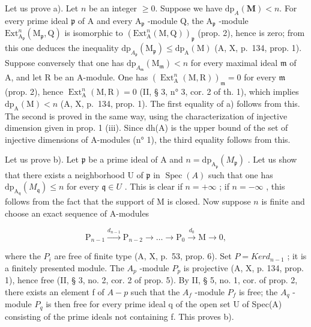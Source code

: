 Let us prove a). Let \(n\) be an integer \(\geqslant 0\). Suppose we have \(\mathrm{dp}_{A}(\mathbf{M}) < n\). For every prime ideal \(\mathfrak{p}\) of A and every \(\mathrm{A}_{\mathfrak{p}}\) -module Q, the \(\mathrm{A}_{\mathfrak{p}}\) -module \(\mathrm{Ext}_{\mathrm{A}_{\mathfrak{p}}}^{n}(\mathrm{M}_{\mathfrak{p}},\mathrm{Q})\) is isomorphic to \((\mathrm{Ext}_{\mathrm{A}}^{n}(\mathrm{M},\mathrm{Q}))_{\mathfrak{p}}\) (prop. 2), hence is zero; from this one deduces the inequality \(\mathrm{dp}_{A_{\mathfrak{p}}}(\mathrm{M}_{\mathfrak{p}}) \leqslant \mathrm{dp}_{\mathrm{A}}(\mathrm{M})\) (A, X, p.~134, prop. 1). Suppose conversely that one has \(\mathrm{dp}_{A_{\mathfrak{m}}}(\mathrm{M}_{\mathfrak{m}}) < n\) for every maximal ideal \(\mathfrak{m}\) of A, and let R be an A-module. One has \((\operatorname{Ext}_{\mathrm{A}}^{n}(\mathrm{M}, \mathrm{R}))_{\mathfrak{m}} = 0\) for every \(\mathfrak{m}\) (prop. 2), hence \(\operatorname{Ext}_{\mathrm{A}}^{n}(\mathrm{M}, \mathrm{R}) = 0\) (II, § 3, n° 3, cor. 2 of th. 1), which implies \(\mathrm{dp}_{\mathrm{A}}(\mathrm{M}) < n\) (A, X, p.~134, prop. 1). The first equality of a) follows from this. The second is proved in the same way, using the characterization of injective dimension given in prop. 1 (iii). Since dh(A) is the upper bound of the set of injective dimensions of A-modules (n° 1), the third equality follows from this.

Let us prove b). Let \(\mathfrak{p}\) be a prime ideal of A and \(n = \mathrm{dp}_{\mathrm{A}_{\mathfrak{p}}}(M_{\mathfrak{p}})\) . Let us show that there exists a neighborhood U of \(\mathfrak{p}\) in \(\operatorname{Spec}(A)\) such that one has \(\mathrm{dp}_{\mathrm{A}_{\mathfrak{q}}}(M_{\mathfrak{q}}) \leqslant n\) for every \(\mathfrak{q} \in U\) . This is clear if \(n = +\infty\) ; if \(n = -\infty\) , this follows from the fact that the support of M is closed. Now suppose \(n\) is finite and choose an exact sequence of A-modules

\[
\mathrm{P} _ {n - 1} \stackrel {d _ {n - 1}} {\longrightarrow} \mathrm{P} _ {n - 2} \longrightarrow \dots \longrightarrow \mathrm{P} _ {0} \stackrel {d _ {0}} {\longrightarrow} \mathrm{M} \rightarrow 0,
\]

where the \(P_{i}\) are free of finite type (A, X, p.~53, prop. 6). Set \(P = Ker d_{n-1}\) ; it is a finitely presented module. The \(A_{p}\) -module \(P_{p}\) is projective (A, X, p. 134, prop. 1), hence free (II, § 3, no. 2, cor. 2 of prop. 5). By II, § 5, no. 1, cor. of prop. 2, there exists an element f of \(A - p\) such that the \(A_{f}\) -module \(P_{f}\) is free; the \(A_{q}\) -module \(P_{q}\) is then free for every prime ideal q of the open set U of Spec(A) consisting of the prime ideals not containing f. This proves b).

